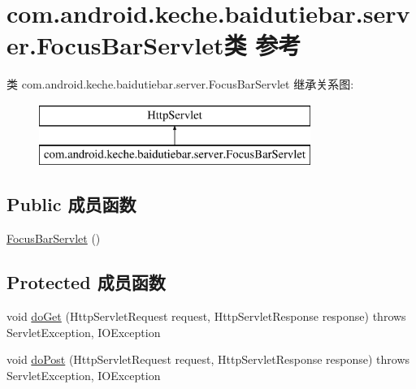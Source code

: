 \hypertarget{classcom_1_1android_1_1keche_1_1baidutiebar_1_1server_1_1_focus_bar_servlet}{}\section{com.\+android.\+keche.\+baidutiebar.\+server.\+Focus\+Bar\+Servlet类 参考}
\label{classcom_1_1android_1_1keche_1_1baidutiebar_1_1server_1_1_focus_bar_servlet}
类 com.\+android.\+keche.\+baidutiebar.\+server.\+Focus\+Bar\+Servlet 继承关系图\+:\begin{figure}[H]
\begin{center}
\leavevmode
\includegraphics[height=2.000000cm]{classcom_1_1android_1_1keche_1_1baidutiebar_1_1server_1_1_focus_bar_servlet}
\end{center}
\end{figure}
\subsection*{Public 成员函数}
\begin{DoxyCompactItemize}
\item 
\mbox{\hyperlink{classcom_1_1android_1_1keche_1_1baidutiebar_1_1server_1_1_focus_bar_servlet_a80df07afce8969d2fba71a7998dec72c}{Focus\+Bar\+Servlet}} ()
\end{DoxyCompactItemize}
\subsection*{Protected 成员函数}
\begin{DoxyCompactItemize}
\item 
void \mbox{\hyperlink{classcom_1_1android_1_1keche_1_1baidutiebar_1_1server_1_1_focus_bar_servlet_aa0ab05484333a6f2e1825216ac79cc26}{do\+Get}} (Http\+Servlet\+Request request, Http\+Servlet\+Response response)  throws Servlet\+Exception, I\+O\+Exception 
\item 
void \mbox{\hyperlink{classcom_1_1android_1_1keche_1_1baidutiebar_1_1server_1_1_focus_bar_servlet_a1cb2ed55c3e4948ec9312e32379bd0ae}{do\+Post}} (Http\+Servlet\+Request request, Http\+Servlet\+Response response)  throws Servlet\+Exception, I\+O\+Exception 
\end{DoxyCompactItemize}


